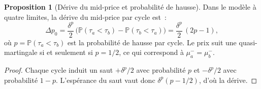 \documentclass[11pt,a4paper]{article}
\theoremstyle{definition}
\newtheorem{proposition}{Proposition}[section]
\newcommand{\Pb}{\mathbb{P}}
\begin{document}
\begin{proposition}[Dérive du mid-price et probabilité de hausse]
\label{prop:drift}
Dans le modèle à quatre limites, la dérive du mid-price par cycle est~:
\[
  \Delta p_0 = \frac{\delta^p}{2}\,\bigl(\Pb(\tau_a<\tau_b) - \Pb(\tau_b<\tau_a)\bigr)
  = \frac{\delta^p}{2}\,(2p-1),
\]
où $p = \Pb(\tau_a<\tau_b)$ est la probabilité de hausse par cycle.
Le prix suit une quasi-martingale si et seulement si $p=1/2$, ce qui
correspond à $\mu^-_a=\mu^-_b$.
\end{proposition}

\begin{proof}
Chaque cycle induit un saut $+\delta^p/2$ avec probabilité $p$ et
$-\delta^p/2$ avec probabilité $1-p$. L'espérance du saut vaut donc
$\delta^p(p-1/2)$, d'où la dérive.
\end{proof}
\end{document}
